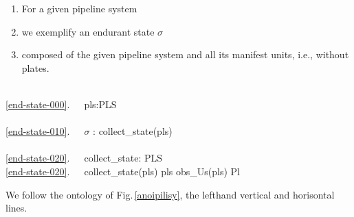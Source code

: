 
\begin{enumerate}\setei
\item \label{end-state-000} For a given pipeline system
\item \label{end-state-010} we exemplify an endurant state $\sigma$
\item \label{end-state-020} composed of the given  pipeline system and
                            all its manifest units, i.e., without plates.
\savei\end{enumerate}

\bp
{}\\
\ref{end-state-000}.\ \ \ pls:PLS\ \ \\
\\
\ref{end-state-010}.\ \ \ $\sigma$ :{\EQ} collect\_state(pls)\ \  \\
 \\
\ref{end-state-020}.\ \ \ collect\_state: PLS\ \ \ \\
\ref{end-state-020}.\ \ \ collect\_state(pls) {\IS} {\LBRACE}pls{\RBRACE}\,{\UNION}\,obs\_Us(pls) {\SETMINUS} Pl
\ep


\begynd
\pind We follow the ontology of Fig.\,\vref{anoipilisy}, \nyl the
lefthand vertical and horisontal lines.
\afslut



